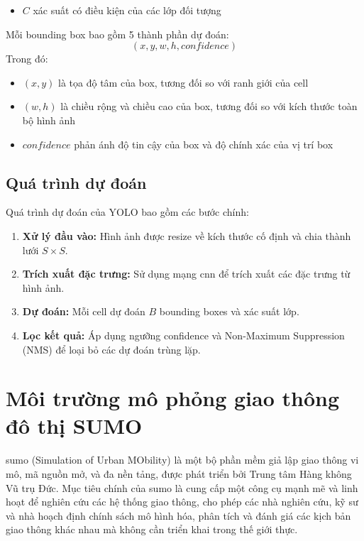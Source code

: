 \begin{enumerate}
\begin{itemize}
    \item $C$ xác suất có điều kiện của các lớp đối tượng
\end{itemize}

Mỗi bounding box bao gồm 5 thành phần dự đoán:
\begin{equation}
    (x, y, w, h, confidence)
\end{equation}
Trong đó:
\begin{itemize}
    \item $(x, y)$ là tọa độ tâm của box, tương đối so với ranh giới của cell

    \item $(w, h)$ là chiều rộng và chiều cao của box, tương đối so với kích
        thước toàn bộ hình ảnh

    \item $confidence$ phản ánh độ tin cậy của box và độ chính xác của vị trí box
\end{itemize}

\subsection{Quá trình dự đoán}
Quá trình dự đoán của YOLO bao gồm các bước chính:
\begin{enumerate}
    \item \textbf{Xử lý đầu vào:} Hình ảnh được resize về kích thước cố định và
        chia thành lưới $S \times S$.

    \item \textbf{Trích xuất đặc trưng:} Sử dụng mạng \ac{cnn} để trích xuất các
        đặc trưng từ hình ảnh.

    \item \textbf{Dự đoán:} Mỗi cell dự đoán $B$ bounding boxes và xác suất lớp.

    \item \textbf{Lọc kết quả:} Áp dụng ngưỡng confidence và Non-Maximum
        Suppression (NMS) để loại bỏ các dự đoán trùng lặp.
\end{enumerate}

\section{Môi trường mô phỏng giao thông đô thị SUMO}
\ac{sumo} (Simulation of Urban MObility) \cite{SUMO2024} là một bộ phần mềm giả lập giao thông vi
mô, mã nguồn mở, và đa nền tảng, được phát triển bởi Trung tâm Hàng không Vũ trụ
Đức. Mục tiêu chính của \ac{sumo} là cung cấp một công cụ mạnh mẽ và linh hoạt
để nghiên cứu các hệ thống giao thông, cho phép các nhà nghiên cứu, kỹ sư và nhà
hoạch định chính sách mô hình hóa, phân tích và đánh giá các kịch bản giao thông
khác nhau mà không cần triển khai trong thế giới thực.


\end{enumerate}
